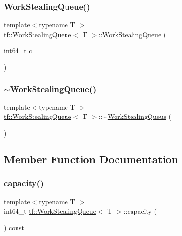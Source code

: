 \subsubsection{\texorpdfstring{Work\+Stealing\+Queue()}{WorkStealingQueue()}}
{\footnotesize\ttfamily template$<$typename T $>$ \\
\hyperlink{classtf_1_1WorkStealingQueue}{tf\+::\+Work\+Stealing\+Queue}$<$ T $>$\+::\hyperlink{classtf_1_1WorkStealingQueue}{Work\+Stealing\+Queue} (\begin{DoxyParamCaption}\item[{int64\+\_\+t}]{c = {} }\end{DoxyParamCaption})}

\mbox{\label{classtf_1_1WorkStealingQueue_acb22a49430fd235aa2ae4770d1cd662b}} 
\subsubsection{\texorpdfstring{$\sim$\+Work\+Stealing\+Queue()}{~WorkStealingQueue()}}
{\footnotesize\ttfamily template$<$typename T $>$ \\
\hyperlink{classtf_1_1WorkStealingQueue}{tf\+::\+Work\+Stealing\+Queue}$<$ T $>$\+::$\sim$\hyperlink{classtf_1_1WorkStealingQueue}{Work\+Stealing\+Queue} (\begin{DoxyParamCaption}{ }\end{DoxyParamCaption})}



\subsection{Member Function Documentation}
\mbox{\label{classtf_1_1WorkStealingQueue_aa24605d46953ae1d27dd35451c72c9b3}} 
\subsubsection{\texorpdfstring{capacity()}{capacity()}}
{\footnotesize\ttfamily template$<$typename T $>$ \\
int64\+\_\+t \hyperlink{classtf_1_1WorkStealingQueue}{tf\+::\+Work\+Stealing\+Queue}$<$ T $>$\+::capacity (\begin{DoxyParamCaption}{ }\end{DoxyParamCaption}) const\hspace{0.3cm}{\ttfamily [noexcept]}}

